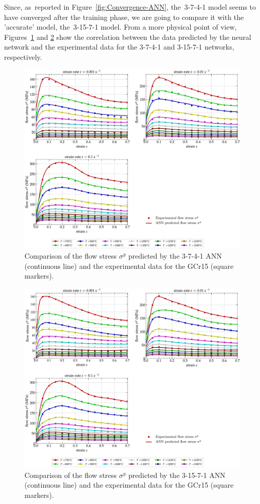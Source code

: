 \documentclass[algorithms,article,accept,pdftex,oneauthors]{Definitions/mdpi}
\begin{document}
Since, as~reported in Figure~\ref{fig:Convergence-ANN}, the~3-7-4-1 model seems to have converged after the training phase, we are going to compare it with the 'accurate' model, the~3-15-7-1 model.
From a more physical point of view, Figures~\ref{fig:CompExpANN-9-4} and \ref{fig:CompExpANN-15-7} show the correlation between the data predicted by the neural network and the experimental data for the 3-7-4-1 and 3-15-7-1 networks, respectively.
\begin{figure}[H]
\includegraphics[width=0.9\columnwidth]{Figures/CompExpANN-3-7-4-1}
\caption{Comparison of the flow stress $\sigma^y$ predicted by the 3-7-4-1 ANN (continuous line) and the experimental data for the GCr15 (square markers).}
\label{fig:CompExpANN-9-4}
\end{figure}
\unskip
\begin{figure}[H]
\includegraphics[width=0.9\columnwidth]{Figures/CompExpANN-3-15-7-1}
\caption{Comparison of the flow stress $\sigma^y$ predicted by the 3-15-7-1 ANN (continuous line) and the experimental data for the GCr15 (square markers).}
\label{fig:CompExpANN-15-7}
\end{figure}
\end{document}
